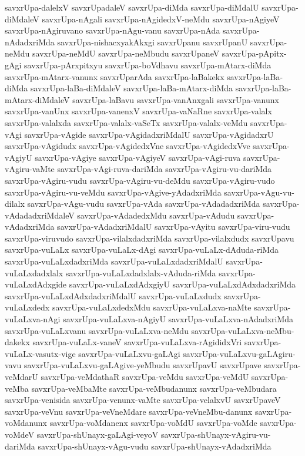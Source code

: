 {savxrUpa-dalelxV
savxrUpadaleV
savxrUpa-diMda
savxrUpa-diMdalU
savxrUpa-diMdaleV
savxrUpa-nAgali
savxrUpa-nAgidedxV-neMdu
savxrUpa-nAgiyeV
savxrUpa-nAgiruvano
savxrUpa-nAgu-vanu
savxrUpa-nAda
savxrUpa-nAdadxriMda
savxrUpa-nishacxyakAkxgi
savxrUpanu
savxrUpanU
savxrUpa-neMdu
savxrUpa-neMdU
savxrUpa-neMbudu
savxrUpaneV
savxrUpa-pApitx-gAgi
savxrUpa-pArxpitxyu
savxrUpa-boVdhavu
savxrUpa-mAtarx-diMda
savxrUpa-mAtarx-vanunx
savxrUparAda
savxrUpa-laBakekx
savxrUpa-laBa-diMda
savxrUpa-laBa-diMdaleV
savxrUpa-laBa-mAtarx-diMda
savxrUpa-laBa-mAtarx-diMdaleV
savxrUpa-laBavu
savxrUpa-vanAnxgali
savxrUpa-vanunx
savxrUpa-vanUnx
savxrUpa-vanenxV
savxrUpa-vaNaRne
savxrUpa-valalx
savxrUpa-valalxda
savxrUpa-valalx-vaSeTx
savxrUpa-valalx-veMdu
savxrUpa-vAgi
savxrUpa-vAgide
savxrUpa-vAgidadxriMdalU
savxrUpa-vAgidadxrU
savxrUpa-vAgidudx
savxrUpa-vAgidedxVne
savxrUpa-vAgidedxVve
savxrUpa-vAgiyU
savxrUpa-vAgiye
savxrUpa-vAgiyeV
savxrUpa-vAgi-ruva
savxrUpa-vAgiru-vaMte
savxrUpa-vAgi-ruva-dariMda
savxrUpa-vAgiru-vu-dariMda
savxrUpa-vAgiru-vudu
savxrUpa-vAgiru-vu-deMdu
savxrUpa-vAgiru-vudo
savxrUpa-vAgiru-vu-veMdu
savxrUpa-vAgive-yAdadxriMda
savxrUpa-vAgu-vu-dilalx
savxrUpa-vAgu-vudu
savxrUpa-vAda
savxrUpa-vAdadadxriMda
savxrUpa-vAdadadxriMdaleV
savxrUpa-vAdadedxMdu
savxrUpa-vAdudu
savxrUpa-vAdadxriMda
savxrUpa-vAdadxriMdalU
savxrUpa-vAyitu
savxrUpa-viru-vudu
savxrUpa-viruvudo
savxrUpa-vilalxdadxriMda
savxrUpa-vilalxdudx
savxrUpavu
savxrUpa-vuLaLx
savxrUpa-vuLaLx-dAgi
savxrUpa-vuLaLx-dAduda-riMda
savxrUpa-vuLaLxdadxriMda
savxrUpa-vuLaLxdadxriMdalU
savxrUpa-vuLaLxdadxlalx
savxrUpa-vuLaLxdadxlalx-vAduda-riMda
savxrUpa-vuLaLxdAdxgide
savxrUpa-vuLaLxdAdxgiyU
savxrUpa-vuLaLxdAdxdadxriMda
savxrUpa-vuLaLxdAdxdadxriMdalU
savxrUpa-vuLaLxdudx
savxrUpa-vuLaLxdedx
savxrUpa-vuLaLxdedxMdu
savxrUpa-vuLaLxva-naMte
savxrUpa-vuLaLxva-nAgi
savxrUpa-vuLaLxva-nAgiyU
savxrUpa-vuLaLxva-nAdadxriMda
savxrUpa-vuLaLxvanu
savxrUpa-vuLaLxva-neMdu
savxrUpa-vuLaLxva-neMbu-dakekx
savxrUpa-vuLaLx-vaneV
savxrUpa-vuLaLxva-rAgididxVri
savxrUpa-vuLaLx-vasutx-vige
savxrUpa-vuLaLxvu-gaLAgi
savxrUpa-vuLaLxvu-gaLAgiru-vavu
savxrUpa-vuLaLxvu-gaLAgive-yeMbudu
savxrUpavU
savxrUpave
savxrUpa-veMdarU
savxrUpa-veMdathaR
savxrUpa-veMdu
savxrUpa-veMdU
savxrUpa-veMba
savxrUpa-veMbaMte
savxrUpa-veMbudanunx
savxrUpa-veMbudara
savxrUpa-venisida
savxrUpa-venunx-vaMte
savxrUpa-velalxvU
savxrUpaveV
savxrUpa-veVnu
savxrUpa-veVneMdare
savxrUpa-veVneMbu-danunx
savxrUpa-voMdanunx
savxrUpa-voMdanenx
savxrUpa-voMdU
savxrUpa-voMde
savxrUpa-voMdeV
savxrUpa-shUnayx-gaLAgi-veyoV
savxrUpa-shUnayx-vAgiru-vu-dariMda
savxrUpa-shUnayx-vAgu-vudu
savxrUpa-shUnayx-vAdadxriMda
}
